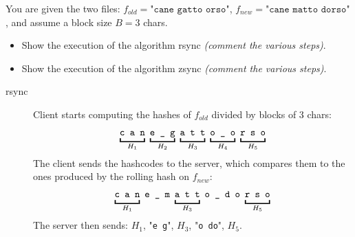 \exercise

You are given the two files: $f_{old} = \texttt{"cane gatto orso"}$, $f_{new} =
\texttt{"cane matto dorso"}$, and assume a block size $B = 3$ chars.
%
\begin{itemize}

  \item Show the execution of the algorithm rsync
  \emph{(comment the various steps)}.

  \item Show the execution of the algorithm zsync
  \emph{(comment the various steps)}.

\end{itemize}

\solution

\begin{description}

  \item[rsync] Client starts computing the hashes of $f_{old}$ divided by blocks
  of 3 chars:
  \begin{align*}
    \underbracket{\vphantom{\tt g}\texttt{c a n}}_{H_1}\
    \underbracket{\texttt{e \_ g}}_{H_2}\
    \underbracket{\vphantom{\tt g}\texttt{a t t}}_{H_3}\
    \underbracket{\vphantom{\tt g}\texttt{o \_ o}}_{H_4}\
    \underbracket{\vphantom{\tt g}\texttt{r s o}}_{H_5}
  \end{align*}
  The client sends the hashcodes to the server, which compares them to the ones
  produced by the rolling hash on $f_{new}$:
  \begin{align*}
    \underbracket{\vphantom{\tt g}\texttt{c a n}}_{H_1}\ \texttt{e \_ m}\
    \underbracket{\vphantom{\tt g}\texttt{a t t}}_{H_3}\ \texttt{o \_ d o}\
    \underbracket{\vphantom{\tt g}\texttt{r s o}}_{H_5}
  \end{align*}
  The server then sends: $H_1$, "\texttt{e g}", $H_3$, "\texttt{o do}", $H_5$.


\end{description}
